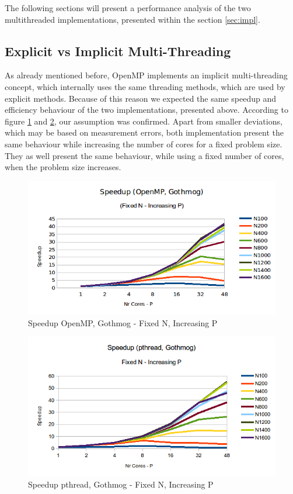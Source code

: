\documentclass[conference]{IEEEtran}
\begin{document}
The following sections will present a performance analysis of the two multithreaded implementations, presented within the section \ref{sec:impl}. 

\subsection{Explicit vs Implicit Multi-Threading}
\label{sec:analysis:pthread}

As already mentioned before, OpenMP implements an implicit multi-threading concept, which internally uses the same threading methods, which are used by explicit methods. Because of this reason we expected the same speedup and efficiency behaviour of the two implementations, presented above. According to figure \ref{pic:omp_speedup_fixed-n} and \ref{pic:pthread_speedup_fixed-n}, our assumption was confirmed. Apart from smaller deviations, which may be based on measurement errors, both implementation present the same behaviour while increasing the number of cores for a fixed problem size. They as well present the same behaviour, while using a fixed number of cores, when the problem size increases. 

\begin{figure}[h]
  \centering
  \includegraphics[scale=0.42]{pic/omp_gothmog_speedup-fixed-n.png} 
  \caption{Speedup OpenMP, Gothmog - Fixed N, Increasing P}
  \label{pic:omp_speedup_fixed-n}
\end{figure}

\begin{figure}[h]
  \centering
  \includegraphics[scale=0.55]{pic/pthread_gothmog_speedup-fixed-n.png} 
  \caption{Speedup pthread, Gothmog - Fixed N, Increasing P}
  \label{pic:pthread_speedup_fixed-n}
\end{figure}
\end{document}
